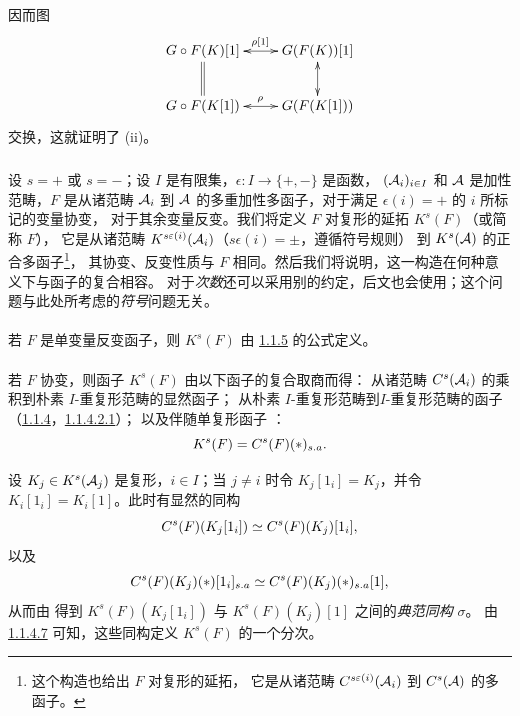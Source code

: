 因而\pageoriginale 图
\[
\xymatrix{
G\circ F(K)[1]  \ar@{<->}[r]^{\rho[1]} \ar@{=}[d] & G(F(K))[1] \ar@{<->}[d]\\
G\circ F(K[1])  \ar@{<->}[r]^{\rho} & G(F(K[1]))
}
\]
交换，这就证明了 (ii)。

\subsubsection{}
设 $s=+$ 或 $s=-$；设 $I$ 是有限集，$\epsilon:I\rightarrow \{+,-\}$ 是函数，
$({\mathcal A}_i)_{i\in I}$ 和 ${\mathcal A}$ 是加性范畴，$F$ 是从诸范畴 ${\mathcal A}_i$ 到
${\mathcal A}$ 的多重加性多函子，对于满足 $\epsilon(i)=+$ 的 $i$ 所标记的变量协变，
对于其余变量反变。我们将定义 $F$ 对复形的延拓 $K^{s}(F)$（或简称 $F$），
它是从诸范畴 $K^{s\varepsilon(i)}({\mathcal A}_i)$（$s\epsilon(i)=\pm$，遵循符号规则）
到 $K^{s}({\mathcal A})$ 的正合多函子\footnote[1]{这个构造也给出 $F$ 对复形的延拓，
  它是从诸范畴 $C^{s\varepsilon(i)}({\mathcal A}_i)$ 到 $C^{s}({\mathcal A})$ 的多函子。}，
其协变、反变性质与 $F$ 相同。然后我们将说明，这一构造在何种意义下与函子的复合相容。
对于\emph{次数}还可以采用别的约定，后文也会使用；这个问题与此处所考虑的\emph{符号}问题无关。

\paragraph{}
若 $F$ 是单变量反变函子，则 $K^{s}(F)$ 由 \hyperref[XVII.subsubsec1.1.5]{1.1.5}
的公式定义。

\paragraph{}
若 $F$ 协变，则函子 $K^{s}(F)$ 由以下函子的复合取商而得：
从诸范畴 $C^{s}({\mathcal A}_i)$ 的乘积到朴素 $I$-重复形范畴的显然函子；
从朴素 $I$-重复形范畴到\pageoriginale $I$-重复形范畴的函子
（\hyperref[XVII.subsubsec1.1.4]{1.1.4}，\hyperref[XVII.par1.1.4.2.1]{1.1.4.2.1}）；
以及伴随单复形函子 ：
\[
K^{s}(F)=C^{s}(F)(\ast)_{s.a}{}.
\]

设 $K_j\in K^{s}({\mathcal A}_j)$ 是复形，$i\in I$；当 $j\neq i$ 时令
$K_j[1_i]=K_j$，并令 $K_i[1_i]=K_{i}[1]$。此时有显然的同构
\[
C^{s}(F)(K_{j}[1_i])\simeq C^{s}(F)(K_j)[1_i]{},
\]
以及
\[
C^{s}(F)(K_j)(\ast)[1_i]_{s.a}\simeq
C^{s}(F)(K_j)(\ast)_{s.a}[1]{},
\]
从而由  得到
$K^{s}(F)(K_{j}[1_i])$ 与 $K^{s}(F)(K_{j})[1]$ 之间的\emph{典范同构} $\sigma$。
由 \hyperref[XVII.par1.1.4.7]{1.1.4.7} 可知，这些同构定义 $K^{s}(F)$ 的一个分次。

